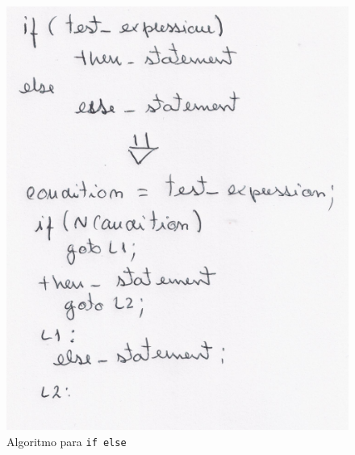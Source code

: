 \begin{figure}[htpb]
	\centering
	\includegraphics[scale=0.75]{./report/img/ifelse.png}
	\caption{Algoritmo para \texttt{if else}}
\label{fig:figure1}
\end{figure}
